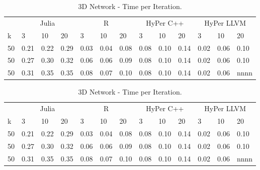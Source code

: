 \begin{table}[htsb]
  \caption[3D Network - Time per Iteration]{3D Network - Time per Iteration.}
  \label{tab:network_all}
  \centering
  \begin{tabular}{l l l l l l l l l l l l l}
    \toprule
      & \multicolumn{3}{c}{Julia} & \multicolumn{3}{c}{R} & \multicolumn{3}{c}{HyPer C++} & \multicolumn{3}{c}{HyPer LLVM}  \\
      k & 3 & 10 & 20 & 3 & 10 & 20 & 3 & 10 & 20 & 3 & 10 & 20 \\
    \midrule
      50  & 0.21 & 0.22 & 0.29 & 0.03 & 0.04 & 0.08 & 0.08 & 0.10 & 0.14 & 0.02 & 0.06 & 0.10 \\
      50  & 0.27 & 0.30 & 0.32 & 0.06 & 0.06 & 0.09 & 0.08 & 0.10 & 0.14 & 0.02 & 0.06 & 0.10 \\
      50  & 0.31 & 0.35 & 0.35 & 0.08 & 0.07 & 0.10 & 0.08 & 0.10 & 0.14 & 0.02 & 0.06 & nnnn \\
    \bottomrule
  \end{tabular}
\end{table}



\begin{table}[htsb]
  \caption[3D Network - Time per Iteration]{3D Network - Time per Iteration.}
  \label{tab:network_all}
  \centering
  \begin{tabular}{l l l l l l l l l l l l l}
    \toprule
      & \multicolumn{3}{c}{Julia} & \multicolumn{3}{c}{R} & \multicolumn{3}{c}{HyPer C++} & \multicolumn{3}{c}{HyPer LLVM}  \\
      k & 3 & 10 & 20 & 3 & 10 & 20 & 3 & 10 & 20 & 3 & 10 & 20 \\
    \midrule
      50  & 0.21 & 0.22 & 0.29 & 0.03 & 0.04 & 0.08 & 0.08 & 0.10 & 0.14 & 0.02 & 0.06 & 0.10 \\
      50  & 0.27 & 0.30 & 0.32 & 0.06 & 0.06 & 0.09 & 0.08 & 0.10 & 0.14 & 0.02 & 0.06 & 0.10 \\
      50  & 0.31 & 0.35 & 0.35 & 0.08 & 0.07 & 0.10 & 0.08 & 0.10 & 0.14 & 0.02 & 0.06 & nnnn \\
    \bottomrule
  \end{tabular}
\end{table}



